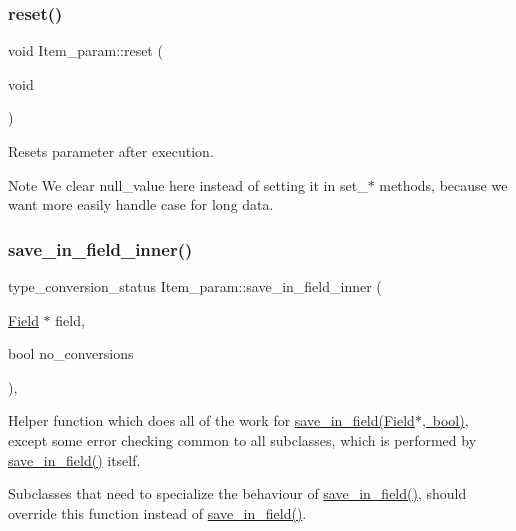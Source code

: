 \subsubsection{\texorpdfstring{reset()}{reset()}}
{\footnotesize\ttfamily void Item\+\_\+param\+::reset (\begin{DoxyParamCaption}\item[{void}]{ }\end{DoxyParamCaption})}

Resets parameter after execution.

\begin{DoxyNote}{Note}
We clear null\+\_\+value here instead of setting it in set\+\_\+$\ast$ methods, because we want more easily handle case for long data. 
\end{DoxyNote}
\mbox{\label{classItem__param_a06432323e21e8640436094b45a7c8cb1}} 
\subsubsection{\texorpdfstring{save\+\_\+in\+\_\+field\+\_\+inner()}{save\_in\_field\_inner()}}
{\footnotesize\ttfamily type\+\_\+conversion\+\_\+status Item\+\_\+param\+::save\+\_\+in\+\_\+field\+\_\+inner (\begin{DoxyParamCaption}\item[{\mbox{\hyperlink{classField}{Field}} $\ast$}]{field,  }\item[{bool}]{no\+\_\+conversions }\end{DoxyParamCaption})\hspace{0.3cm}{\ttfamily [protected]}, {\ttfamily [virtual]}}

Helper function which does all of the work for \mbox{\hyperlink{classItem_acf4c1888a07e9e0dd5787283c6569545}{save\+\_\+in\+\_\+field(\+Field$\ast$, bool)}}, except some error checking common to all subclasses, which is performed by \mbox{\hyperlink{classItem_acf4c1888a07e9e0dd5787283c6569545}{save\+\_\+in\+\_\+field()}} itself.

Subclasses that need to specialize the behaviour of \mbox{\hyperlink{classItem_acf4c1888a07e9e0dd5787283c6569545}{save\+\_\+in\+\_\+field()}}, should override this function instead of \mbox{\hyperlink{classItem_acf4c1888a07e9e0dd5787283c6569545}{save\+\_\+in\+\_\+field()}}.


